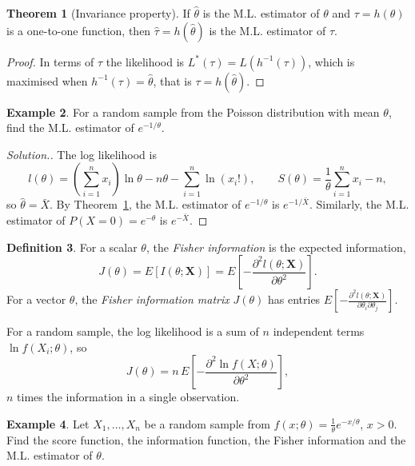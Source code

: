 \documentclass[12pt,a4paper]{report}
\theoremstyle{definition}
\newtheorem{thm}{Theorem}[section]
\newtheorem{definition}[thm]{Definition}
\newtheorem{example}[thm]{Example}
\theoremstyle{plain}
\newenvironment{solution}
  {\renewcommand{\qedsymbol}{}\begin{proof}[\textit{Solution}.]}
  {\end{proof}}
\begin{document}
\begin{thm}[Invariance property]
\label{thm:invariance}
If $\hat{\theta}$ is the M.L. estimator of $\theta$ and $\tau = h(\theta)$ is a
one-to-one function, then $\hat{\tau} = h(\hat{\theta})$ is the M.L. estimator of
$\tau$.
\end{thm}

\begin{proof}
In terms of $\tau$ the likelihood is $L^*(\tau) = L\left(h^{-1}(\tau)\right)$, which
is maximised when $h^{-1}(\tau) = \hat\theta$, that is $\tau = h(\hat\theta)$.
\end{proof}

\begin{example}
\label{ex:mlepoissoninvariance}
For a random sample from the Poisson distribution with mean $\theta$, find the
M.L. estimator of $e^{-1/\theta}$.
\end{example}

\begin{solution}
The log likelihood is
\[l(\theta) = \left(\sum^n_{i = 1} x_i\right)\ln \theta - n\theta - \sum^n_{i =
1}\ln(x_i!) ,\qquad S(\theta) = \frac{1}{\theta}\sum^n_{i = 1} x_i - n ,\]
so $\hat{\theta} = \bar{X}$. By Theorem~\ref{thm:invariance}, the M.L. estimator
of $e^{-1/\theta}$ is $e^{-1/\bar X}$. Similarly, the M.L. estimator of
$P(X = 0) = e^{-\theta}$ is $e^{-\bar X}$.
\end{solution}

\begin{definition}
\label{def:fisher}
For a scalar $\theta$, the \emph{Fisher information} is the expected information,
\[J(\theta) = E\left[I(\theta;\mathbf X)\right] = E\left[-\frac{\partial^2
l(\theta;\mathbf X)}{\partial \theta^2}\right].\]
For a vector $\theta$, the \emph{Fisher information matrix} $J(\theta)$ has
entries $E\left[-\frac{\partial^2 l(\theta;\mathbf X)}{\partial \theta_i\partial
\theta_j}\right]$.
\end{definition}

For a random sample, the log likelihood is a sum of $n$ independent terms
$\ln f(X_i;\theta)$, so
\[J(\theta) = n\,E\left[-\frac{\partial^2 \ln f(X;\theta)}{\partial
\theta^2}\right],\]
$n$ times the information in a single observation.

\begin{example}
\label{ex:mleexpscale}
Let $X_1, \dots , X_n$ be a random sample from
$f(x;\theta) = \frac{1}{\theta}e^{-x/\theta}$, $x > 0$. Find the score function,
the information function, the Fisher information and the M.L. estimator of
$\theta$.
\end{example}
\end{document}
